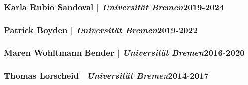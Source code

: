 \documentclass[11pt]{article}
\begin{document}
\subsubsection{Karla Rubio Sandoval $|$ {\normalfont\textit{Universität Bremen}}\hfill 2019-2024}
\subsubsection{Patrick Boyden $|$ {\normalfont\textit{Universität Bremen}}\hfill 2019-2022}
\subsubsection{Maren Wohltmann Bender $|$ {\normalfont\textit{Universität Bremen}}\hfill 2016-2020}
\subsubsection{Thomas Lorscheid $|$ {\normalfont\textit{Universität Bremen}}\hfill 2014-2017}
\bigskip
\end{document}
